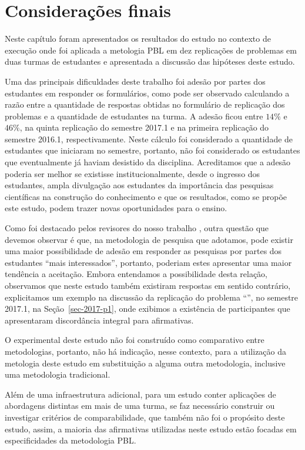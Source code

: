 \section{Considerações finais}
\label{sec-consideracoes-resultados}
Neste capítulo foram apresentados os resultados do estudo no contexto de execução onde foi aplicada a
metologia PBL em dez replicações de problemas em duas turmas de estudantes e apresentada a discussão
das hipóteses deste estudo.

Uma das principais dificuldades deste trabalho foi adesão
por partes dos estudantes em responder os formulários,
como pode ser observado calculando a razão entre
a quantidade de respostas obtidas no formulário de
replicação dos problemas e a quantidade de estudantes
na turma.
A adesão ficou entre $14\%$ e $46\%$, na
quinta replicação do semestre 2017.1 e na primeira
replicação do semestre 2016.1, respectivamente.
Neste cálculo foi considerado a quantidade de estudantes
que iniciaram no semestre, portanto, não foi considerado os
estudantes que eventualmente já haviam desistido
da disciplina.
Acreditamos que a adesão poderia ser melhor se existisse
institucionalmente, desde o ingresso dos estudantes,
ampla divulgação aos estudantes da importância das pesquisas
científicas na construção do conhecimento e que os resultados,
como se propõe este estudo, podem trazer novas oportunidades
para o ensino.

Como foi destacado pelos revisores do nosso trabalho \cite{gavaza2017},
outra questão que devemos observar é que, na metodologia de pesquisa
que adotamos, pode existir uma maior possibilidade
de adesão em responder as pesquisas por partes
dos estudantes ``mais interessados'', portanto, poderiam
estes apresentar uma maior tendência a aceitação.
Embora entendamos a possibilidade desta relação, observamos que
neste estudo também existiram respostas em sentido
contrário, explicitamos um exemplo na discussão da
replicação do problema ``\ProblemaG'', no semestre 2017.1,
na Seção~\ref{sec-2017-p1}, onde exibimos a existência
de participantes que apresentaram discordância integral
para afirmativas.

O experimental deste estudo não foi construído como comparativo
entre metodologias, portanto, não há indicação, nesse
contexto, para a utilização da metologia deste estudo
em substituição a alguma outra metodologia, inclusive uma
metodologia tradicional.

Além de uma infraestrutura adicional, para um estudo conter
aplicações de abordagens distintas em mais de uma turma,
se faz necessário construir ou investigar critérios de
comparabilidade, que também não foi o propósito deste estudo,
assim, a maioria das afirmativas utilizadas neste estudo
estão focadas em especificidades da metodologia PBL.


